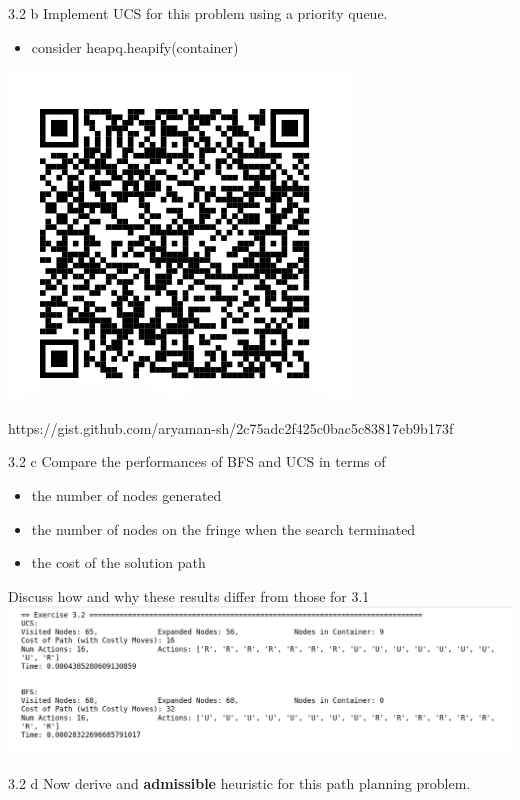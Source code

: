\documentclass[11pt]{beamer}
\begin{document}
\begin{frame}{3.2 b}
Implement UCS for this problem using a priority queue.
\pause
\begin{itemize}
	\item consider heapq.heapify(container)
\end{itemize}
\pause
\begin{center}
\includegraphics[scale=0.4]{ucs.png}
\end{center}
https://gist.github.com/aryaman-sh/2c75adc2f425c0bac5c83817eb9b173f
\end{frame}

\begin{frame}{3.2 c}
Compare the performances of BFS and UCS in terms of 
\begin{itemize}
	\item the number of nodes generated
	\item the number of nodes on the fringe when the search terminated
	\item the cost of the solution path
\end{itemize}
Discuss how and why these results differ from those for 3.1\\
\pause
\includegraphics[scale=0.25]{32cans.png}
\end{frame}

\begin{frame}{3.2 d}
Now derive and \textbf{admissible} heuristic for this path planning problem.
\end{frame}
\end{document}
